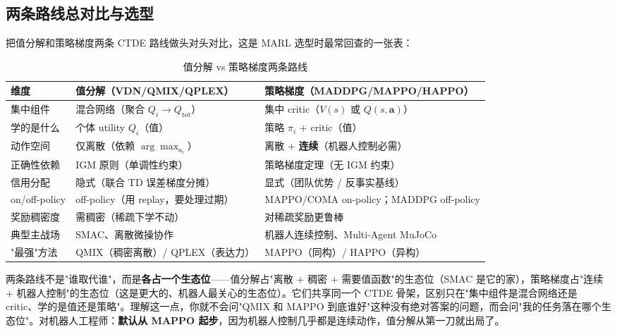 \subsection{两条路线总对比与选型}

把值分解和策略梯度两条 CTDE 路线做头对头对比，这是 MARL 选型时最常回查的一张表：

\begin{table}[H]\centering\small
\caption{值分解 vs 策略梯度两条路线}
\label{tab:sm-two-lines}
\begin{tabular}{p{} p{} p{}}
\toprule
维度 & 值分解（VDN/QMIX/QPLEX） & 策略梯度（MADDPG/MAPPO/HAPPO） \\
\midrule
集中组件 & 混合网络（聚合 $Q_i\to Q_{\text{tot}}$） & 集中 critic（$V(s)$ 或 $Q(s,\mathbf{a})$） \\
学的是什么 & 个体 utility $Q_i$（值） & 策略 $\pi_i$ $+$ critic（值） \\
动作空间 & 仅离散（依赖 $\arg\max_{a_i}$） & 离散 $+$ \textbf{连续}（机器人控制必需） \\
正确性依赖 & IGM 原则（单调性约束） & 策略梯度定理（无 IGM 约束） \\
信用分配 & 隐式（联合 TD 误差梯度分摊） & 显式（团队优势 / 反事实基线） \\
on/off-policy & off-policy（用 replay，要处理过期） & MAPPO/COMA on-policy；MADDPG off-policy \\
奖励稠密度 & 需稠密（稀疏下学不动） & 对稀疏奖励更鲁棒 \\
典型主战场 & SMAC、离散微操协作 & 机器人连续控制、Multi-Agent MuJoCo \\
"最强"方法 & QMIX（稠密离散）/ QPLEX（表达力） & MAPPO（同构）/ HAPPO（异构） \\
\bottomrule
\end{tabular}
\end{table}

\begin{insight}
两条路线不是"谁取代谁"，而是\textbf{各占一个生态位}——值分解占"离散 $+$ 稠密 $+$ 需要值函数"的生态位（SMAC 是它的家），策略梯度占"连续 $+$ 机器人控制"的生态位（这是更大的、机器人最关心的生态位）。它们共享同一个 CTDE 骨架，区别只在"集中组件是混合网络还是 critic、学的是值还是策略"。理解这一点，你就不会问"QMIX 和 MAPPO 到底谁好"这种没有绝对答案的问题，而会问"我的任务落在哪个生态位"。对机器人工程师：\textbf{默认从 MAPPO 起步}，因为机器人控制几乎都是连续动作，值分解从第一刀就出局了。
\end{insight}

